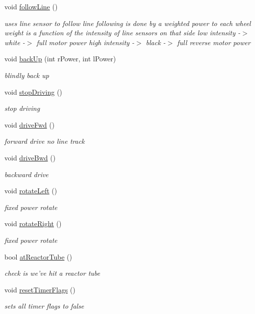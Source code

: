 \begin{DoxyCompactItemize}
void \hyperlink{classRobot_a6e3caf6e0346f6a54557eb57a79fc4f4}{follow\-Line} ()
\begin{DoxyCompactList}\small\item\em uses line sensor to follow line following is done by a weighted power to each wheel weight is a function of the intensity of line sensors on that side low intensity -\/$>$ white -\/$>$ full motor power high intensity -\/$>$ black -\/$>$ full reverse motor power \end{DoxyCompactList}\item 
void \hyperlink{classRobot_a450cf38f963596663003f3d94b2bcf3b}{back\-Up} (int r\-Power, int l\-Power)
\begin{DoxyCompactList}\small\item\em blindly back up \end{DoxyCompactList}\item 
void \hyperlink{classRobot_a959f64b4829ade78bb332f205b50ee70}{stop\-Driving} ()
\begin{DoxyCompactList}\small\item\em stop driving \end{DoxyCompactList}\item 
void \hyperlink{classRobot_a35897f5e7b5c8b29cc6d386c6089abea}{drive\-Fwd} ()
\begin{DoxyCompactList}\small\item\em forward drive no line track \end{DoxyCompactList}\item 
void \hyperlink{classRobot_ac8d0a3e0308350bc1fc3a2a78be2aaca}{drive\-Bwd} ()
\begin{DoxyCompactList}\small\item\em backward drive \end{DoxyCompactList}\item 
void \hyperlink{classRobot_a82a61a1f5fb4a17fd2277329bc6e8fe4}{rotate\-Left} ()
\begin{DoxyCompactList}\small\item\em fixed power rotate \end{DoxyCompactList}\item 
void \hyperlink{classRobot_a33e931c5ce2e2ce940c96203f1b6d057}{rotate\-Right} ()
\begin{DoxyCompactList}\small\item\em fixed power rotate \end{DoxyCompactList}\item 
bool \hyperlink{classRobot_a9183b1dd60c7d39bf6c8ecea5690b22c}{at\-Reactor\-Tube} ()
\begin{DoxyCompactList}\small\item\em check is we've hit a reactor tube \end{DoxyCompactList}\item 
void \hyperlink{classRobot_ab7c87529c987ede12b934bdfc768507e}{reset\-Timer\-Flags} ()
\begin{DoxyCompactList}\small\item\em sets all timer flags to false \end{DoxyCompactList}\end{DoxyCompactItemize}
